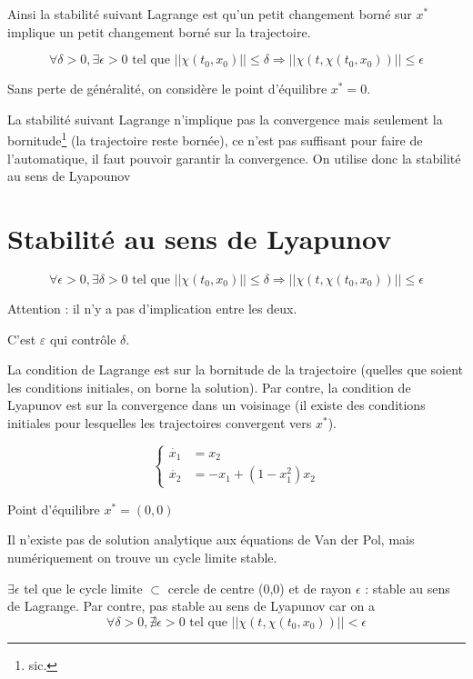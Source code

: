 \documentclass[main.tex]{subfiles} \newcommand{\D}{\mathcal{D}}
\begin{document}
Ainsi la stabilité suivant Lagrange est qu'un petit changement borné sur $x^*$
implique un petit changement borné sur la trajectoire.

\[\forall \delta > 0, \exists \epsilon > 0 \text{ tel que }  ||\chi(t_0,x_0)||
\leq \delta \Rightarrow ||\chi(t,\chi(t_0,x_0))|| \leq \epsilon \]

Sans perte de généralité, on considère le point d'équilibre $x^* = 0$.


\begin{rem} La stabilité suivant Lagrange n'implique pas la convergence mais
seulement la bornitude\footnote{sic.} (la trajectoire reste bornée), ce n'est
pas suffisant pour faire de l'automatique, il faut pouvoir garantir la
convergence. On utilise donc la stabilité au sens de Lyapounov \end{rem}

\section{Stabilité au sens de Lyapunov}

\begin{defin} \[\forall \epsilon > 0, \exists \delta > 0 \text{ tel que }
||\chi(t_0,x_0)|| \leq \delta \Rightarrow || \chi(t,\chi(t_0,x_0)) || \leq
\epsilon\] \end{defin}

Attention : il n'y a pas d'implication entre les deux.

\begin{rem} C'est $\varepsilon$ qui contrôle $\delta$.  \end{rem} \begin{rem}
	La condition de Lagrange est sur la bornitude de la trajectoire (quelles
	que soient les conditions initiales, on borne la solution). Par contre, la
	condition de Lyapunov est sur la convergence dans un voisinage (il existe
	des conditions initiales pour lesquelles les trajectoires convergent vers
	$x^*$).  \end{rem}

\begin{exemple} \[ \begin{cases} \dot{x_1} & =
x_2\\ \dot{x_2} & = -x_1 + (1-x_ 1^2)x_2 \end{cases} \]

  Point d'équilibre $x^* =(0,0)$

  \begin{rem} Il n'existe pas de solution analytique aux équations de Van der
  Pol, mais numériquement on trouve un cycle limite stable.  \end{rem}


  $\exists \epsilon$ tel que le cycle limite $\subset$ cercle de centre (0,0)
  et de rayon $\epsilon$ : stable au sens de Lagrange. Par contre, pas stable
  au sens de Lyapunov car on a \[ \forall \delta > 0, \nexists \epsilon > 0
  \text{ tel que } ||\chi(t,\chi(t_0,x_0))|| < \epsilon \]

\end{exemple}
\end{document}
